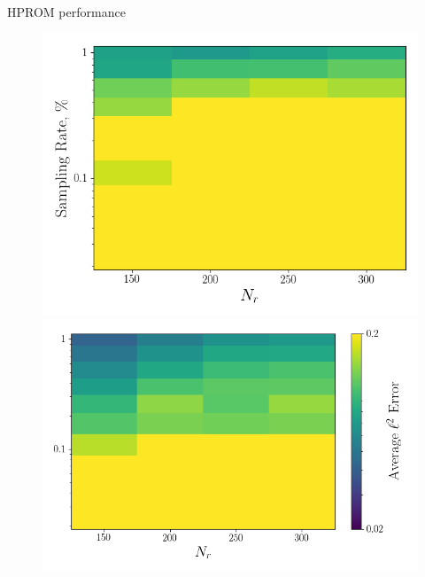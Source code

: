 \documentclass[]{beamer}
\begin{document}
\begin{frame}{HPROM performance}
\begin{figure}
		\begin{minipage}{0.35\linewidth}
			\includegraphics[width=0.99\linewidth]{Images/experiments/cvrc/err_contour_gnat1_dt5e-7.png}
		\end{minipage}
		\begin{minipage}{0.4\linewidth}
			\includegraphics[width=0.99\linewidth]{Images/experiments/cvrc/err_contour_gnat2_dt5e-7.png}
		\end{minipage}
	\end{figure}
\end{frame}
\end{document}
